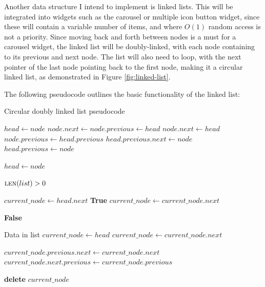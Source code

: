 \documentclass[../main/main.tex]{subfiles}
\begin{document}
Another data structure I intend to implement is linked lists. This will be integrated into widgets such as the carousel or multiple icon button widget, since these will contain a variable number of items, and where $O(1)$ random access is not a priority. Since moving back and forth between nodes is a must for a carousel widget, the linked list will be doubly-linked, with each node containing to its previous and next node. The list will also need to loop, with the next pointer of the last node pointing back to the first node, making it a circular linked list, as demonstrated in Figure \ref{fig:linked-list}.

The following pseudocode outlines the basic functionality of the linked list:

\begin{algorithm}[H]
\caption{Circular doubly linked list pseudocode}
\begin{algorithmic}
            \State $head \gets node$
            \State $node.next \gets node.previous \gets head$
        \Else
            \State $node.next \gets head$
            \State $node.previous \gets head.previous$
            \State $head.previous.next \gets node$
            \State $head.previous \gets node$

            \bigskip

            \State $head \gets node$
        \EndIf
    \EndFunction

    \bigskip

    \State \Require $\Call{len}{list} > 0$

        \State $current\_node \gets head.next$
                \State \Return \textbf{True}
            \EndIf
            \State $current\_node \gets current\_node.next$
        \EndWhile

        \State \Return \textbf{False}
    \EndFunction

    \bigskip

    \State \Require Data in list
        \State $current\_node \gets head$
            \State $current\_node \gets current\_node.next$
        \EndWhile

        \bigskip

        \State $current\_node.previous.next \gets current\_node.next$
        \State $current\_node.next.previous \gets current\_node.previous$

        \bigskip

        \State \textbf{delete} $current\_node$
    \EndFunction
\end{algorithmic}
\end{algorithm}
\end{document}
